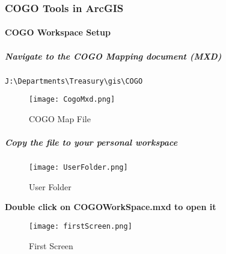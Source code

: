 %
%
%
 \def\titlename{Parcel Editing with COGO in ArcGIS}
 \def\authorName{Allegan County GIS Services}
 \def\pdfTitle{Parcel Editing with COGO in ArcGIS}
 \def\pdfSubject{GIS Tools} %
 \def\pdfKeywords{mobile,gis}

 
  
\subsubsection[COGO Tools in ArcGIS]{COGO Tools in ArcGIS}
\vspace{.1in}

\paragraph{COGO Workspace Setup}

\subparagraph[The COGO Mapping Document(mxd)]{\textbf{Navigate to the COGO Mapping document (MXD)}}
 \begin{verbatim}
J:\Departments\Treasury\gis\COGO
\end{verbatim}

\begin{figure}[h!]
\centering
    \texttt{[image: CogoMxd.png]}

\caption{COGO Map File}
\end{figure}
%

\subparagraph*{Copy the file to your personal workspace}

\begin{figure}[h!]
\centering
    \texttt{[image: UserFolder.png]}

\caption{User Folder}
\end{figure}
%
\clearpage  

{\textbf{Double click on COGOWorkSpace.mxd to open it}}

\begin{figure}[h!]
\centering
    \texttt{[image: firstScreen.png]}

\caption{First Screen}
\end{figure}
%

